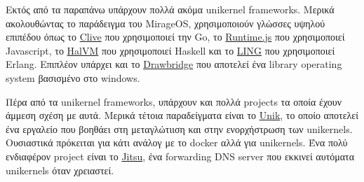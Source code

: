 Εκτός από τα παραπάνω υπάρχουν πολλά ακόμα unikernel frameworks. Μερικά
ακολουθώντας το παράδειγμα του MirageOS, χρησιμοποιούν γλώσσες υψηλού επιπέδου
όπως το \href{http://lsub.org/ls/clive.html}{Clive} που χρησιμοποιεί την Go, το
\href{http://runtimejs.org/}{Runtime.js} που χρησιμοποιεί Javascript, το
\href{http://galois.com/project/halvm/}{HalVM} που χρησιμοποιεί Haskell και το
\href{http://erlangonxen.org/}{LING} που χρησιμοποιεί Erlang. Επιπλέον
υπάρχει και το
\href{http://research.microsoft.com/en-us/projects/drawbridge/}{Drawbridge} που
αποτελεί ένα library operating system βασισμένο στο windows. 

Πέρα από τα unikernel frameworks, υπάρχουν και πολλά projects τα οποία έχουν
άμμεση σχέση με αυτά. Μερικά τέτοια παραδείγματα είναι το
\href{https://github.com/emc-advanced-dev/unik}{Unik}, το οποίο αποτελεί ένα
εργαλείο που βοηθάει στη μεταγλώτιιση και στην ενορχήστρωση των unikernels.
Ουσιαστικά πρόκειται για κάτι ανάλογ με το docker αλλά για unikernels. Ένα πολύ
ενδιαφέρον project είναι το \href{https://github.com/mirage/jitsu}{Jitsu}, ένα
forwarding DNS server που εκκινεί αυτόματα unikernels όταν χρειαστεί.  
